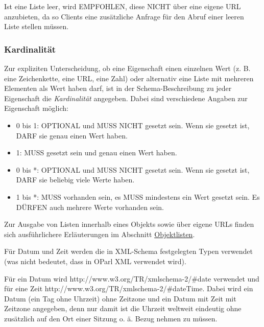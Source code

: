 \documentclass[,a4paper]{article}
\begin{document}
Ist eine Liste leer, wird EMPFOHLEN, diese NICHT über eine eigene URL
anzubieten, da so Clients eine zusätzliche Anfrage für den Abruf einer
leeren Liste stellen müssen.

\subsubsection{Kardinalität}\label{kardinalituxe4t}

Zur expliziten Unterscheidung, ob eine Eigenschaft einen einzelnen Wert
(z. B. eine Zeichenkette, eine URL, eine Zahl) oder alternativ eine
Liste mit mehreren Elementen als Wert haben darf, ist in der
Schema-Beschreibung zu jeder Eigenschaft die \emph{Kardinalität}
angegeben. Dabei sind verschiedene Angaben zur Eigenschaft möglich:

\begin{itemize}
\item
  0 bis 1: OPTIONAL und MUSS NICHT gesetzt sein. Wenn sie gesetzt ist,
  DARF sie genau einen Wert haben.
\item
  1: MUSS gesetzt sein und genau einen Wert haben.
\item
  0 bis *: OPTIONAL und MUSS NICHT gesetzt sein. Wenn sie gesetzt ist,
  DARF sie beliebig viele Werte haben.
\item
  1 bis *: MUSS vorhanden sein, es MUSS mindestens ein Wert gesetzt
  sein. Es DÜRFEN auch mehrere Werte vorhanden sein.
\end{itemize}

Zur Ausgabe von Listen innerhalb eines Objekts sowie über eigene URLs
finden sich ausführlichere Erläuterungen im Abschnitt
\hyperref[objektlisten]{Objektlisten}.


Für Datum und Zeit werden die in XML-Schema festgelegten Typen verwendet
(was nicht bedeutet, dass in OParl XML verwendet wird).

Für ein Datum wird http://www.w3.org/TR/xmlschema-2/\#date verwendet und
für eine Zeit http://www.w3.org/TR/xmlschema-2/\#dateTime. Dabei wird
ein Datum (ein Tag ohne Uhrzeit) ohne Zeitzone und ein Datum mit Zeit
mit Zeitzone angegeben, denn nur damit ist die Uhrzeit weltweit
eindeutig ohne zusätzlich auf den Ort einer Sitzung o. ä. Bezug nehmen
zu müssen.
\end{document}

